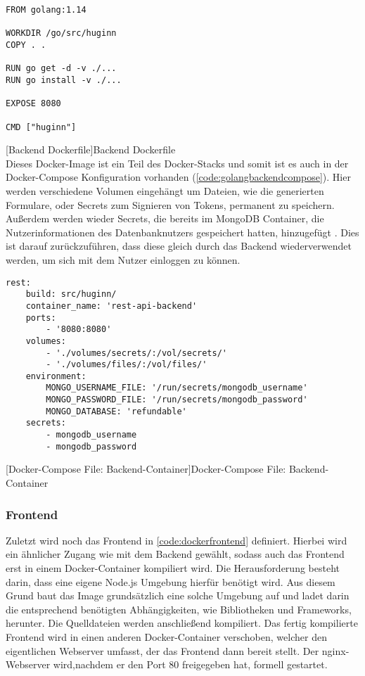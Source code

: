 \begin{verbatim}
FROM golang:1.14
	
WORKDIR /go/src/huginn
COPY . .
	
RUN go get -d -v ./...
RUN go install -v ./...
	
EXPOSE 8080
	
CMD ["huginn"]
\end{verbatim}
[Backend Dockerfile]{Backend Dockerfile}
\label{code:backgodocker}
~\\
Dieses Docker-Image ist ein Teil des Docker-Stacks und somit ist es auch in der Docker-Compose Konfiguration vorhanden (\autoref{code:golangbackendcompose}). Hier werden verschiedene Volumen eingehängt um Dateien, wie die generierten Formulare, oder Secrets zum Signieren von Tokens, permanent zu speichern. Außerdem werden wieder Secrets, die bereits im MongoDB Container, die Nutzerinformationen des Datenbanknutzers gespeichert hatten, hinzugefügt \cite{secretmongo}. Dies ist darauf zurückzuführen, dass diese gleich durch das Backend wiederverwendet werden, um sich mit dem Nutzer einloggen zu können.

\begin{verbatim}
rest:
	build: src/huginn/
	container_name: 'rest-api-backend'
	ports:
		- '8080:8080'
	volumes:
		- './volumes/secrets/:/vol/secrets/'
		- './volumes/files/:/vol/files/'
	environment:
		MONGO_USERNAME_FILE: '/run/secrets/mongodb_username'
		MONGO_PASSWORD_FILE: '/run/secrets/mongodb_password'
		MONGO_DATABASE: 'refundable'
	secrets:
		- mongodb_username
		- mongodb_password
\end{verbatim}
[Docker-Compose File: Backend-Container]{Docker-Compose File: Backend-Container}
\label{code:golangbackendcompose}

\newpage

\subsubsection{Frontend}

Zuletzt wird noch das Frontend in \autoref{code:dockerfrontend} definiert. Hierbei wird ein ähnlicher Zugang wie mit dem Backend gewählt, sodass auch das Frontend erst in einem Docker-Container kompiliert wird. Die Herausforderung besteht darin, dass eine eigene Node.js Umgebung hierfür benötigt wird. Aus diesem Grund baut das Image grundsätzlich eine solche Umgebung auf und ladet darin die entsprechend benötigten Abhängigkeiten, wie Bibliotheken und Frameworks, herunter. Die Quelldateien werden anschließend kompiliert. Das fertig kompilierte Frontend wird in einen anderen Docker-Container verschoben, welcher den eigentlichen Webserver umfasst, der das Frontend dann bereit stellt. Der nginx-Webserver wird,nachdem er den Port 80 freigegeben hat, formell gestartet.

